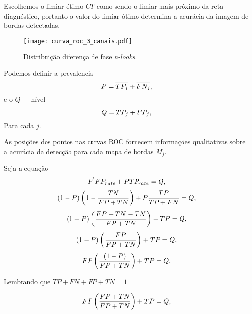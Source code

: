 Escolhemos o limiar ótimo $CT$ como sendo o limiar mais próximo da reta diagnóstico, portanto o valor do limiar ótimo  determina a acurácia da imagem de bordas detectadas. 

\begin{figure}[hbt]
\centering
\texttt{[image: curva\_roc\_3\_canais.pdf]}
	\caption{Distribuição diferença de fase {\it n-looks}.}
\label{cap_fusao_fig03}
\end{figure}


Podemos definir a prevalencia
\begin{equation}\label{cap_fusao_25}
	P =\overline{TP_j}+\overline{FN_j}, \\
\end{equation}
e o $Q-$ nível
\begin{equation}\label{cap_fusao_26}
	Q =\overline{TP_j}+\overline{FP_j}, \\
\end{equation}
Para cada $j$.


As posições dos pontos nas curvas ROC fornecem informações qualitativas sobre a acurácia da detecção para cada mapa de bordas $M_j$. 

Seja a equação
\begin{equation}\label{cap_fusao_27}
     P^{'}FP_{rate}+P TP_{rate} = Q, \\
\end{equation}
\begin{equation}\label{cap_fusao_28}
     (1-P)\left(1-\frac{TN}{FP+TN}\right)+P \frac{TP}{TP+FN} = Q, \\
\end{equation}
\begin{equation}\label{cap_fusao_29}
     (1-P) \left(\frac{FP+TN-TN}{FP+TN}\right)+TP = Q, \\
\end{equation}
\begin{equation}\label{cap_fusao_30}
     (1-P) \left(\frac{FP}{FP+TN}\right)+TP = Q, \\
\end{equation}
\begin{equation}\label{cap_fusao_31}
      FP\left(\frac{(1-P)}{FP+TN}\right)+TP = Q, \\
\end{equation}

 Lembrando que $TP+FN+FP+TN=1$

\begin{equation}\label{cap_fusao_32}
      FP\left(\frac{FP+TN}{FP+TN}\right)+TP = Q, \\
\end{equation}

